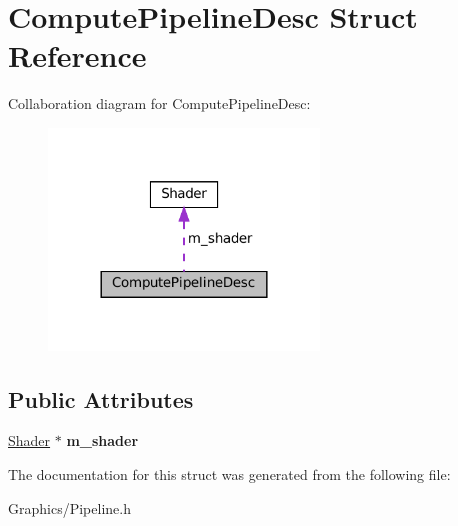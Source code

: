 \hypertarget{structComputePipelineDesc}{}\section{Compute\+Pipeline\+Desc Struct Reference}
\label{structComputePipelineDesc}


Collaboration diagram for Compute\+Pipeline\+Desc\+:
\nopagebreak
\begin{figure}[H]
\begin{center}
\leavevmode
\includegraphics[width=204pt]{structComputePipelineDesc__coll__graph}
\end{center}
\end{figure}
\subsection*{Public Attributes}
\begin{DoxyCompactItemize}
\item 
\mbox{\label{structComputePipelineDesc_a54a7e5b14a70eb58b96ed98246f7d123}} 
\hyperlink{classShader}{Shader} $\ast$ {\bfseries m\+\_\+shader}
\end{DoxyCompactItemize}


The documentation for this struct was generated from the following file\+:\begin{DoxyCompactItemize}
\item 
Graphics/Pipeline.\+h\end{DoxyCompactItemize}
